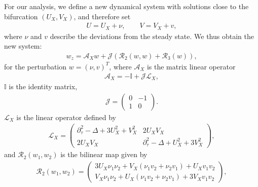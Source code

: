 For our analysis, we define a new dynamical system with solutions close to 
the bifurcation $(U_X, V_X)$, and therefore set
\begin{eqnarray}
\label{pertu}
U = U_X + \nu, \quad \quad V = V_X + v,
\end{eqnarray}
%
where $\nu$ and $v$ describe the deviations from the steady state. We thus 
obtain the new system:
%
\begin{align}
w_z = \mathcal{A}_Xw + \mathcal{J}(\mathcal{R}_{2} (w, w) + \mathcal{R}_3 (w)),
\label{bif1}
\end{align}
%
for the perturbation $w = (\nu, v)^T$, 
where $\mathcal{A}_X$ is the matrix linear operator 
%
\begin{align}
\mathcal{A}_X = -\mathbb{I} + \mathcal{J}\mathcal{L}_X,  
\label{Ax}
\end{align}
%
$\mathbb{I} $ is the identity matrix,
%
\begin{align}
\mathcal{J} = \begin{pmatrix} 0 & -1 \\ 1 & 0  \end{pmatrix}.
\nonumber
\end{align}
%
$\mathcal{L}_X$ is the linear operator defined by
%
\begin{align}
\mathcal{L}_X = \begin{pmatrix} \partial^2_{\tau} - \Delta + 3 U_X^2 + V_X^2 & 2U_X V_X \\ 2 U_X V_X & \partial^2_{\tau} - \Delta + U_X^2 + 3V_X^2 \end{pmatrix},
\nonumber
\end{align}
%
and $\mathcal{R}_{2} (w_1, w_2)$  is the bilinear map given by
%
\begin{align}
\mathcal{R}_{2} (w_1,w_2) = \begin{pmatrix} 3U_X \nu_1 \nu_2 + V_X (\nu_1 v_2 + \nu_2 v_1) + U_X v_1 v_2 \\
V_X \nu_1 \nu_2 + U_X (\nu_1 v_2 + \nu_2 v_1) + 3 V_X v_1 v_2 \end{pmatrix},
\nonumber
\end{align}
